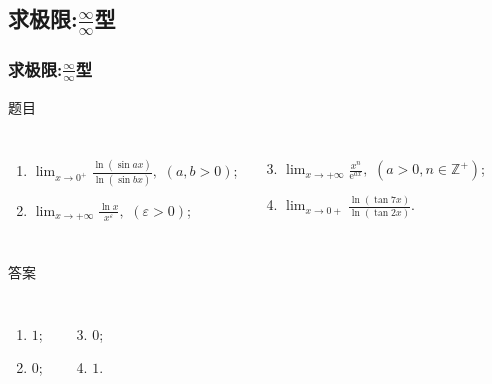 \documentclass[
10pt,
aspectratio=43,
]{beamer}
\begin{document}
\subsection{求极限:$\displaystyle\frac{\infty}{\infty}$型}
\begin{frame}
	\frametitle{求极限:$\displaystyle\frac{\infty}{\infty}$型}
	\everymath{\displaystyle}
	\begin{block}{题目}
		\begin{columns}[onlytextwidth]
			\begin{enumerate}
				\item $\lim _{x \rightarrow 0^+} \frac{\ln (\sin a x)}{\ln (\sin b x)},\,\,(a,b>0)$;
				\item $\lim _{x \rightarrow+\infty} \frac{\ln x}{x^{\varepsilon}},\,\,(\varepsilon>0)$;
			\end{enumerate}
			\begin{enumerate}
				\setcounter{enumi}{2}
				\item $\lim _{x \rightarrow+\infty} \frac{x^n}{\mathrm{e}^{a x}},\,\,(a>0, n\in\mathbb{Z}^+)$;
				\item $\lim _{x \rightarrow 0+} \frac{\ln (\tan 7 x)}{\ln (\tan 2 x)}$.
			\end{enumerate}
		\end{columns}
	\end{block}

	\begin{exampleblock}{答案}
		\begin{columns}[onlytextwidth]
			\begin{enumerate}
				\pause
				\item $1$;
				\item $0$;
			\end{enumerate}
			\begin{enumerate}
				\setcounter{enumi}{2}
				\pause
				\item $0$;
				\item $1$.
			\end{enumerate}
		\end{columns}
	\end{exampleblock}
\end{frame}
\end{document}
